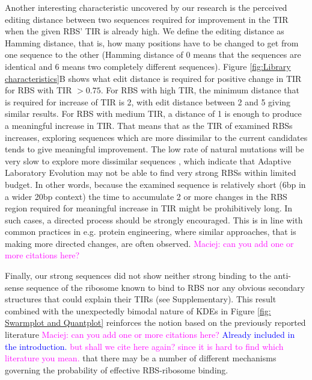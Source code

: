 \documentclass{article}
\newcommand{\mengyan}[1]{\textcolor{magenta}{#1}}
\newcommand{\maciej}[1]{\textcolor{blue}{#1}}
\begin{document}
Another interesting characteristic uncovered by our research is the perceived editing distance between two sequences required for  improvement in the TIR when the given RBS' TIR is already high. 
We define the editing distance as Hamming distance, that is, how many positions have to be changed to get from one sequence to the other (Hamming distance of 0 means that the sequences are identical and 6 means two completely different sequences).
Figure \ref{fig:Library characteristics}B shows what edit distance is required for positive change in TIR for RBS with TIR $>0.75$.
For RBS with high TIR, the minimum distance that is required for increase of TIR is 2, with edit distance between 2 and 5 giving similar results.
For RBS with medium TIR, a distance of 1 is enough to produce a meaningful increase in TIR.
That means that as the TIR of examined RBSs increases, 
exploring sequences which are more dissimilar to the current candidates tends to give meaningful improvement. 
The low rate of natural mutations will be very slow to explore more dissimilar sequences \cite{Lee2012},
which indicate that Adaptive Laboratory Evolution may not be able to find very strong RBSs within limited budget.  
In other words, because the examined sequence is relatively short (6bp in a wider 20bp context) the time to accumulate 2 or more changes in the RBS region required for meaningful increase in TIR might be prohibitively long.
In such cases, a directed process should be strongly encouraged.
This is in line with common practices in e.g. protein engineering, where similar approaches, that is making more directed changes, are often observed.
\mengyan{Maciej: can you add one or more citations here?}

Finally, our strong sequences did not show neither strong binding to the anti-sense sequence of the ribosome known to bind to RBS nor any obvious secondary structures that could explain their TIRs (see Supplementary).
This result combined with the unexpectedly bimodal nature of KDEs in Figure \ref{fig: Swarmplot and Quantplot} reinforces the notion based on the previously reported literature \mengyan{Maciej: can you add one or more citations here?} \maciej{Already included in the introduction.} \mengyan{but shall we cite here again? since it is hard to find which literature you mean.} that there may be a number of different mechanisms governing the probability of effective RBS-ribosome binding.\\
\end{document}
